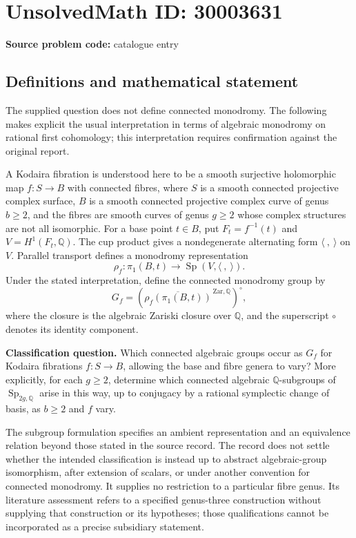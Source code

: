 \documentclass[11pt]{article}
\newcommand{\Q}{\mathbb{Q}}
\begin{document}
\section*{UnsolvedMath ID: 30003631}
\textbf{Source problem code:} catalogue entry
\subsection{Definitions and mathematical statement}
The supplied question does not define connected monodromy. The following makes explicit the usual interpretation in terms of algebraic monodromy on rational first cohomology; this interpretation requires confirmation against the original report.

A Kodaira fibration is understood here to be a smooth surjective holomorphic map \(f\colon S\to B\) with connected fibres, where \(S\) is a smooth connected projective complex surface, \(B\) is a smooth connected projective complex curve of genus \(b\geq 2\), and the fibres are smooth curves of genus \(g\geq 2\) whose complex structures are not all isomorphic. For a base point \(t\in B\), put \(F_t=f^{-1}(t)\) and \(V=H^1(F_t,\Q)\). The cup product gives a nondegenerate alternating form \(\langle\ ,\ \rangle\) on \(V\). Parallel transport defines a monodromy representation
\[
\rho_f\colon\pi_1(B,t)\longrightarrow\operatorname{Sp}(V,\langle\ ,\ \rangle).
\]
Under the stated interpretation, define the connected monodromy group by
\[
G_f=\left(\overline{\rho_f(\pi_1(B,t))}^{\,\mathrm{Zar},\Q}\right)^\circ,
\]
where the closure is the algebraic Zariski closure over \(\Q\), and the superscript \(\circ\) denotes its identity component.

\textbf{Classification question.} Which connected algebraic groups occur as \(G_f\) for Kodaira fibrations \(f\colon S\to B\), allowing the base and fibre genera to vary? More explicitly, for each \(g\geq 2\), determine which connected algebraic \(\Q\)-subgroups of \(\operatorname{Sp}_{2g,\Q}\) arise in this way, up to conjugacy by a rational symplectic change of basis, as \(b\geq 2\) and \(f\) vary.

The subgroup formulation specifies an ambient representation and an equivalence relation beyond those stated in the source record. The record does not settle whether the intended classification is instead up to abstract algebraic-group isomorphism, after extension of scalars, or under another convention for connected monodromy. It supplies no restriction to a particular fibre genus. Its literature assessment refers to a specified genus-three construction without supplying that construction or its hypotheses; those qualifications cannot be incorporated as a precise subsidiary statement.
\end{document}
